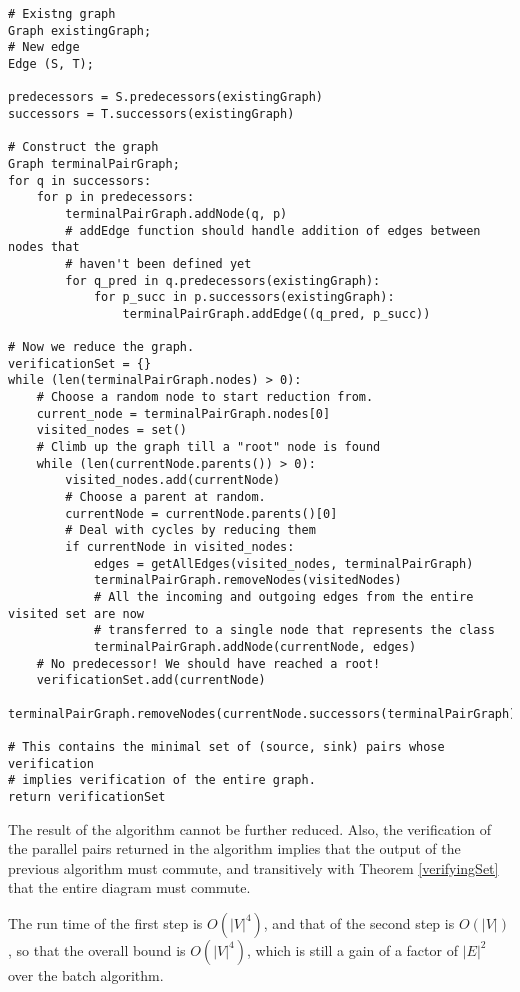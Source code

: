 \documentclass{article}
\begin{document}
\begin{verbatim}
# Existng graph
Graph existingGraph;
# New edge
Edge (S, T);

predecessors = S.predecessors(existingGraph)
successors = T.successors(existingGraph)

# Construct the graph
Graph terminalPairGraph;
for q in successors:
    for p in predecessors:
        terminalPairGraph.addNode(q, p)
        # addEdge function should handle addition of edges between nodes that 
        # haven't been defined yet
        for q_pred in q.predecessors(existingGraph):
            for p_succ in p.successors(existingGraph):
                terminalPairGraph.addEdge((q_pred, p_succ))

# Now we reduce the graph.
verificationSet = {}
while (len(terminalPairGraph.nodes) > 0):
    # Choose a random node to start reduction from.
    current_node = terminalPairGraph.nodes[0]
    visited_nodes = set()
    # Climb up the graph till a "root" node is found
    while (len(currentNode.parents()) > 0):
        visited_nodes.add(currentNode)
        # Choose a parent at random.
        currentNode = currentNode.parents()[0]
        # Deal with cycles by reducing them
        if currentNode in visited_nodes:
            edges = getAllEdges(visited_nodes, terminalPairGraph)
            terminalPairGraph.removeNodes(visitedNodes)
            # All the incoming and outgoing edges from the entire visited set are now 
            # transferred to a single node that represents the class
            terminalPairGraph.addNode(currentNode, edges)
    # No predecessor! We should have reached a root!
    verificationSet.add(currentNode)
    terminalPairGraph.removeNodes(currentNode.successors(terminalPairGraph)

# This contains the minimal set of (source, sink) pairs whose verification 
# implies verification of the entire graph. 
return verificationSet

\end{verbatim}

The result of the algorithm cannot be further reduced. Also, the verification of the parallel pairs returned in the algorithm implies that the output of the previous algorithm must commute, and transitively with Theorem \ref{verifyingSet} that the entire diagram must commute.

The run time of the first step is $O(|V|^4)$, and that of the second step is $O(|V|)$, so that the overall bound is $O(|V|^4)$, which is still a gain of a factor of $|E|^2$ over the batch algorithm.
\end{document}

